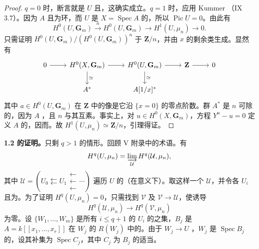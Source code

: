 \begin{proof}
$q=0$ 时，断言就是 $U$ 且，这确实成立。$q=1$ 时，应用 Kummer （IX 3.7）。因为 $A$ 且为环，而 $U$ 是 $X=\operatorname{Spec}A$ 的，所以 $\operatorname{Pic}U=0$。由此有
\[H^0(U,\mathbf G_m)\xrightarrow{n}H^0(U,\mathbf G_m)\longrightarrow H^1(U,\mu_n)\longrightarrow0.\]
只需证明 $H^0(U,\mathbf G_m)/(H^0(U,\mathbf G_m))^n$ 于 $\mathbf Z/n$，并由 $x$ 的剩余类生成。显然有
\[\begin{tikzcd}0\arrow[r]&H^0(X,\mathbf G_m)\arrow[r]\arrow[d,"\simeq"]&H^0(U,\mathbf G_m)\arrow[r]\arrow[d,"\simeq"]&\mathbf Z\arrow[r]&0\\&A^*&A[1/x]^*\end{tikzcd}\]
其中 $a\in H^0(U,\mathbf G_m)$ 在 $\mathbf Z$ 中的像是它沿 $\{x=0\}$ 的零点阶数。群 $A^*$ 是 $n$ 可除的，因为 $A$ ，且 $n$ 与其互素。事实上，对 $u\in H^0(X,\mathbf G_m)$，方程 $Y^n-u=0$ 定义 $A$ 的，因而。故 $H^1(U,\mu_n)\simeq\mathbf Z/n$，引理得证。
\end{proof}
\textbf{1.2 的证明。}只剩 $q>1$ 的情形。回顾 V 附录中的术语。有
\[H^q(U,\mu_n)=\varinjlim_{\mathcal U}H^q(\mathcal U,\mu_n),\]
其中 $\mathcal U=(U_0\leftleftarrows U_1\mathrel{\substack{\leftarrow\\[-.6ex]\leftarrow\\[-.6ex]\leftarrow}}\cdots)$ 遍历 $U$ 的（在意义下）。取这样一个 $\mathcal U$，并令各 $U_i$ 且为。为了证明 $H^q(U,\mu_n)=0$，只需找到 $\mathcal V$ 及 $\mathcal V\to\mathcal U$，使诱导
\[H^q(\mathcal U,\mu_n)\longrightarrow H^q(\mathcal V,\mu_n)\]
为零。设 $\{W_1,\ldots,W_m\}$ 是所有 $i\le q+1$ 的 $U_i$ 的之集，$B_j$ 是 $A=k[[x_1,\ldots,x_r]]$ 在 $W_j$ 的 $R(W_j)$ 中的。由于 $W_j\to U$ ，$W_j$
是 $\operatorname{Spec}B_j$ 的，设其补集为 $\operatorname{Spec}C_j$，其中 $C_j$ 为 $B_j$ 的适当。
